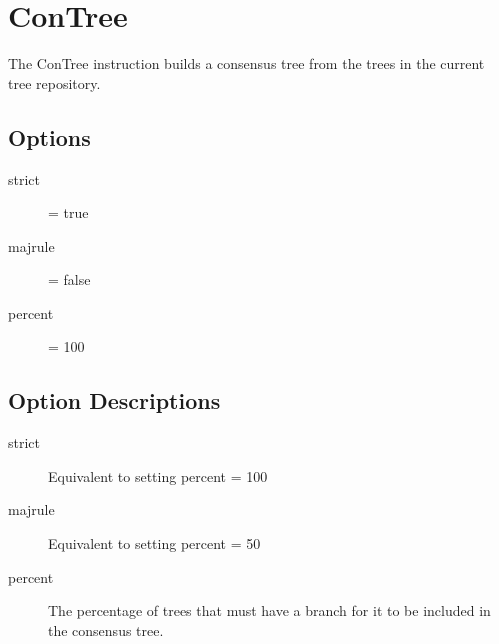 \section{ConTree}

The ConTree instruction builds a consensus tree from the trees in the current tree repository.

\subsection{Options}
\begin{description}
\item[strict] = true
\item[majrule] = false
\item[percent] = 100
\end{description}

\subsection{Option Descriptions}

\begin{description}
\item[strict] Equivalent to setting percent = 100
\item[majrule]  Equivalent to setting percent = 50
\item[percent] The percentage of trees that must have a branch for it to be included in the consensus tree.
\end{description}